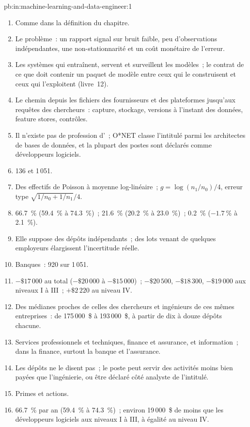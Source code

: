 \begin{solution}{pb:in:machine-learning-and-data-engineer:1}
\begin{enumerate}
\item Comme dans la définition du chapitre.
\item Le problème~: un rapport signal sur bruit faible, peu d'observations indépendantes, une non-stationnarité et un coût monétaire de l'erreur.
\item Les systèmes qui entraînent, servent et surveillent les modèles~; le contrat de ce que doit contenir un paquet de
modèle entre ceux qui le construisent et ceux qui l'exploitent (livre~12).
\item Le chemin depuis les fichiers des fournisseurs et des plateformes jusqu'aux requêtes des chercheurs~: capture, stockage, versions à l'instant des données,
feature stores, contrôles.
\item Il n'existe pas de profession d'~; O*NET classe l'intitulé parmi les architectes de bases de
données, et la plupart des postes sont déclarés comme développeurs logiciels.
\item 136 et 1\,051.
\item Des effectifs de Poisson à moyenne log-linéaire~; $g=\log(n_1/n_0)/4$, erreur type $\sqrt{1/n_0+1/n_1}/4$.
\item 66.7~\% (59.4~\% à 74.3~\%)~; 21.6~\% (20.2~\% à 23.0~\%)~; 0.2~\% ($-1.7~\%$ à 2.1~\%).
\item Elle suppose des dépôts indépendants~; des lots venant de quelques employeurs élargissent l'incertitude réelle.
\item Banques~: 920 sur 1\,051.
\item $-\$17\,000$ au total ($-\$20\,000$ à $-\$15\,000$)~; $-\$20\,500$, $-\$18\,300$, $-\$19\,000$ aux niveaux I à III~;
$+\$2\,220$ au niveau IV.
\item Des médianes proches de celles des chercheurs et ingénieurs de ces mêmes entreprises~: de 175\,000~\$ à 193\,000~\$, à partir de dix à douze dépôts chacune.
\item Services professionnels et techniques, finance et assurance, et information~; dans la finance, surtout la banque et
l'assurance.
\item Les dépôts ne le disent pas~; le poste peut servir des activités moins bien payées que l'ingénierie, ou être déclaré côté analyste
de l'intitulé.
\item Primes et actions.
\item 66.7~\% par an (59.4~\% à 74.3~\%)~; environ 19\,000~\$ de moins que les développeurs logiciels aux niveaux I à III, à égalité au niveau IV.

\end{enumerate}
\end{solution}

